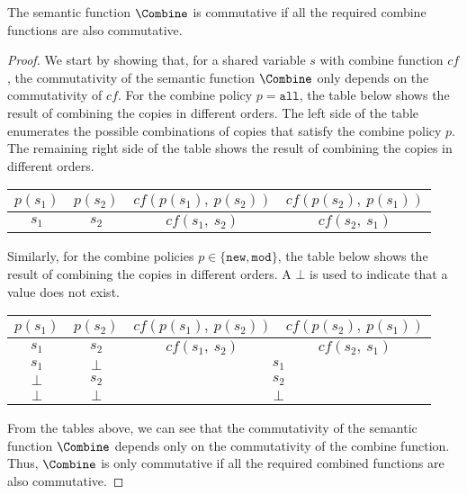 \begin{theorem}
	\label{thm:commutative_combine}
	The semantic function $\Combine$ is commutative if all the 
	required combine functions are also commutative.
\end{theorem}
\begin{proof}
	We start by showing that, for a shared variable $s$ with 
	combine function $cf$, the commutativity of the semantic function 
	$\Combine$ only depends on the commutativity of $cf$. For the 
	combine policy $p = \mathtt{all}$, the table below shows the 
	result of combining the copies in different orders. The 
	left side of the table enumerates the possible combinations of 
	copies that satisfy the combine policy $p$. The remaining right 
	side of the table shows the result of combining the copies in
	different orders.
	\begin{center}
		\renewcommand{\arraystretch}{1.25}
		\begin{tabular}{| c | c || c | c |}
			\hline
			\boldmath$p(s_1)$	& \boldmath$p(s_2)$	& \boldmath$cf(p(s_1),~p(s_2))$	& \boldmath$cf(p(s_2),~p(s_1))$	\\ 
			\hline \hline
			$s_1$				& $s_2$				& $cf(s_1,~s_2)$				& $cf(s_2,~s_1)$				\\
			\hline
		\end{tabular}
	\end{center}
	Similarly, for the combine policies $p \in \{\mathtt{new}, \mathtt{mod}\}$, the 
	table below shows the result of combining the copies in 
	different orders. A $\bot$ is used to indicate that a value 
	does not exist.
	\begin{center}
		\renewcommand{\arraystretch}{1.25}
		\begin{tabular}{| c | c || c | c |}
			\hline
			\boldmath$p(s_1)$	& \boldmath$p(s_2)$	& \boldmath$cf(p(s_1),~p(s_2))$	& \boldmath$cf(p(s_2),~p(s_1))$	\\ 
			\hline \hline
			$s_1$				& $s_2$				& $cf(s_1,~s_2)$				& $cf(s_2,~s_1)$				\\ \hline
			$s_1$				& $\bot$			& \multicolumn{2}{c|}{$s_1$}									\\ \hline			
			$\bot$				& $s_2$				& \multicolumn{2}{c|}{$s_2$}									\\ \hline			
			$\bot$				& $\bot$			& \multicolumn{2}{c|}{$\bot$}									\\			
			\hline
		\end{tabular}
	\end{center}
	From the tables above, we can see that the commutativity
	of the semantic function $\Combine$ depends only on the 
	commutativity of the combine function.
	Thus, $\Combine$ is only commutative
	if all the required combined functions are also commutative.
\end{proof}

